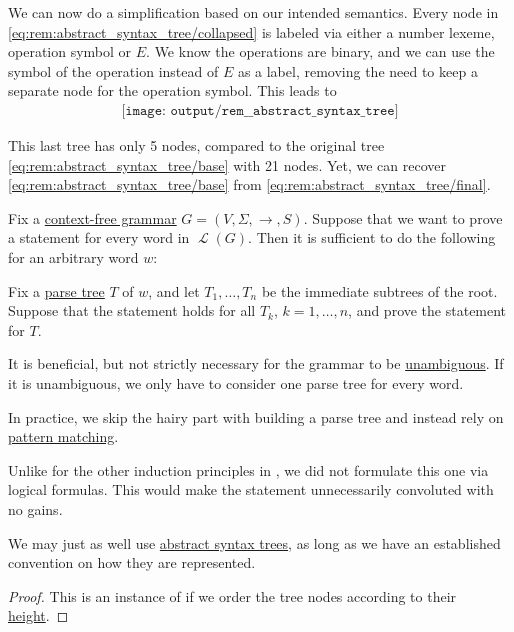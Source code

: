 \begin{remark}
  We can now do a simplification based on our intended semantics. Every node in \eqref{eq:rem:abstract_syntax_tree/collapsed} is labeled via either a number lexeme, operation symbol or \( E \). We know the operations are binary, and we can use the symbol of the operation instead of \( E \) as a label, removing the need to keep a separate node for the operation symbol. This leads to
  \begin{equation}\label{eq:rem:abstract_syntax_tree/final}
    \begin{aligned}
      \texttt{[image: output/rem\_\_abstract\_syntax\_tree]}
    \end{aligned}
  \end{equation}

  This last tree has only 5 nodes, compared to the original tree \eqref{eq:rem:abstract_syntax_tree/base} with 21 nodes. Yet, we can recover \eqref{eq:rem:abstract_syntax_tree/base} from \eqref{eq:rem:abstract_syntax_tree/final}.
\end{remark}

\begin{theorem}\label{thm:induction_on_syntax_trees}
  Fix a \hyperref[def:chomsky_hierarchy/context_free]{context-free grammar} \( G = (V, \Sigma, \to, S) \). Suppose that we want to prove a statement for every word in \( \mscrL(G) \). Then it is sufficient to do the following for an arbitrary word \( w \):
  \begin{displayquote}
    Fix a \hyperref[def:parse_tree]{parse tree} \( T \) of \( w \), and let \( T_1, \ldots, T_n \) be the immediate subtrees of the root. Suppose that the statement holds for all \( T_k \), \( k = 1, \ldots, n \), and prove the statement for \( T \).
  \end{displayquote}
\end{theorem}
\begin{comments}
  \item It is beneficial, but not strictly necessary for the grammar to be \hyperref[def:grammar_ambiguity]{unambiguous}. If it is unambiguous, we only have to consider one parse tree for every word.
  \item In practice, we skip the hairy part with building a parse tree and instead rely on \hyperref[rem:evaluation]{pattern matching}.
  \item Unlike for the other induction principles in , we did not formulate this one via logical formulas. This would make the statement unnecessarily convoluted with no gains.
  \item We may just as well use \hyperref[rem:abstract_syntax_tree]{abstract syntax trees}, as long as we have an established convention on how they are represented.
\end{comments}
\begin{proof}
  This is an instance of  if we order the tree nodes according to their \hyperref[def:rooted_tree/height]{height}.
\end{proof}

